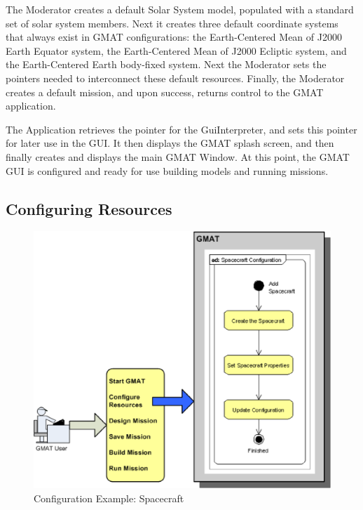 The Moderator creates a default Solar System model, populated with a standard set of solar system
members.  Next it creates three default coordinate systems that always exist in GMAT configurations:
the Earth-Centered Mean of J2000 Earth Equator system, the Earth-Centered Mean of J2000 Ecliptic
system, and the Earth-Centered Earth body-fixed system.  Next the Moderator sets the pointers
needed to interconnect these default resources.  Finally, the Moderator creates a default mission,
and upon success, returns control to the GMAT application.

The Application retrieves the pointer for the GuiInterpreter, and sets this pointer for later use in
the GUI.  It then displays the GMAT splash screen, and then finally creates and displays the main
GMAT Window.  At this point, the GMAT GUI is configured and ready for use building models and
running missions.

\subsection{Configuring Resources}

\begin{figure}[htb]
\begin{center}
\includegraphics[scale=0.4]{Images/GMAT_ConfigureResource.eps}
\caption{\label{figure:ResourceConfig}Configuration Example: Spacecraft}
\end{center}
\end{figure}


